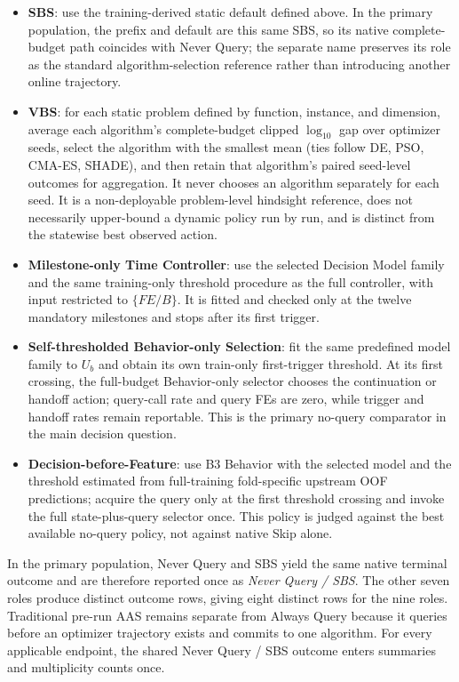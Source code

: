 \begin{itemize}
  \item \textbf{SBS}: use the training-derived static default defined above.  In the primary population, the prefix and default are this same SBS, so its native complete-budget path coincides with Never Query; the separate name preserves its role as the standard algorithm-selection reference rather than introducing another online trajectory.
  \item \textbf{VBS}: for each static problem defined by function, instance, and dimension, average each algorithm's complete-budget clipped $\log_{10}$ gap over optimizer seeds, select the algorithm with the smallest mean (ties follow DE, PSO, CMA-ES, SHADE), and then retain that algorithm's paired seed-level outcomes for aggregation.  It never chooses an algorithm separately for each seed.  It is a non-deployable problem-level hindsight reference, does not necessarily upper-bound a dynamic policy run by run, and is distinct from the statewise best observed action.
  \item \textbf{Milestone-only Time Controller}: use the selected Decision Model family and the same training-only threshold procedure as the full controller, with input restricted to $\{FE/B\}$.  It is fitted and checked only at the twelve mandatory milestones and stops after its first trigger.
  \item \textbf{Self-thresholded Behavior-only Selection}: fit the same predefined model family to $U_b$ and obtain its own train-only first-trigger threshold.  At its first crossing, the full-budget Behavior-only selector chooses the continuation or handoff action; query-call rate and query FEs are zero, while trigger and handoff rates remain reportable.  This is the primary no-query comparator in the main decision question.
  \item \textbf{Decision-before-Feature}: use B3 Behavior with the selected model and the threshold estimated from full-training fold-specific upstream OOF predictions; acquire the query only at the first threshold crossing and invoke the full state-plus-query selector once.  This policy is judged against the best available no-query policy, not against native Skip alone.
\end{itemize}
In the primary population, Never Query and SBS yield the same native terminal
outcome and are therefore reported once as \emph{Never Query / SBS}.  The other
seven roles produce distinct outcome rows, giving eight distinct rows for the
nine roles.  Traditional pre-run AAS remains separate from Always Query because
it queries before an optimizer trajectory exists and commits to one algorithm.
For every applicable endpoint, the shared Never Query / SBS outcome enters
summaries and multiplicity counts once.

